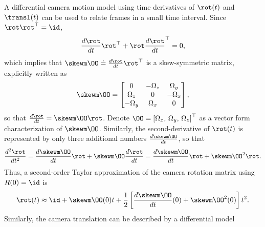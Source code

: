 A differential camera motion model using
time derivatives of $\rot(t)$ and $\transl(t)$ can be used to relate frames in a
small time interval. Since
$\rot\rot^\top = \id$,
\begin{equation}
\frac{d\rot}{dt}\rot^\top + \rot \frac{d\rot}{dt}^\top = 0,
\end{equation}
which implies that $\skewm \OO \doteq \frac{d\rot}{dt}\rot^\top$ is a
skew-symmetric matrix, explicitly written as
\begin{equation}
\skewm \OO = 
\begin{bmatrix}
0 & -\Omega_z & \Omega_y \\ \Omega_z & 0 & -\Omega_x \\ -\Omega_y & \Omega_x & 0 
\end{bmatrix},
\end{equation}
so that $\frac{d\rot}{dt} = \skewm\OO \rot$.
Denote $\OO = \left[\Omega_x,\, \Omega_y,\,
\Omega_z\right]^\top$ as a vector form characterization of $\skewm\OO$.
Similarly, the second-derivative of $\rot(t)$ is represented by only three
additional numbers $\frac{d\skewm\OO}{dt}$, so that
\begin{equation}\label{eq:rot:tt:atzero}
\frac{d^2\rot}{dt^2} = \frac{d\skewm \OO}{dt} \rot  + \skewm \OO
\frac{d\rot}{dt}  = 
%
\frac{d\skewm \OO}{dt} \rot  + \skewm \OO^2
\rot. 
\end{equation}
Thus, a second-order Taylor approximation of the camera rotation matrix using
$R(0) = \id$ is
\begin{equation}
\rot(t) \approx \id + \skewm \OO (0) t + \frac{1}{2} \left[ \frac{d\skewm \OO}{dt}(0) +
\skewm\OO^2(0) \right]t^2.
\end{equation}
%
Similarly, the camera translation can be described by a differential model
%
%
%
%
%
%
%
%
%
